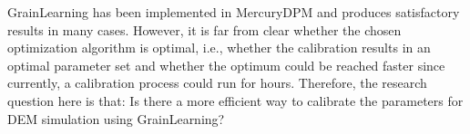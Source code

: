 \documentclass[../BachelorAssignment.tex]{subfiles}
\begin{document}
GrainLearning has been implemented in MercuryDPM and produces satisfactory results in many cases. However, it is far from clear whether the chosen optimization algorithm is optimal, i.e., whether the calibration results in an optimal parameter set and whether the optimum could be reached faster since currently, a calibration process could run for hours. Therefore, the research question here is that: Is there a more efficient way to calibrate the parameters for DEM simulation using GrainLearning?
\end{document}

